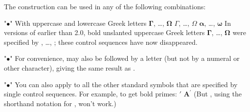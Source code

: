\medskip
The  construction can be used in any of the following
combinations:
\roster
\item"$\bullet$" With uppercase and lowercase Greek letters
\beginexample{\exboxwidth=3.75in}
        $\boldsymbol\Gamma$, \dots, $\boldsymbol\Omega$
        $\boldsymbol\varGamma$, \dots, $\boldsymbol\varOmega$
        $\boldsymbol\alpha$, \dots, $\boldsymbol\omega$
\endexample
\noindent
In versions of \AmSTeX{} earlier than 2.0, bold unslanted uppercase
Greek letters $\boldsymbol\Gamma$, \dots, $\boldsymbol\Omega$ were
specified by , \dots, ; these control
sequences have now disappeared.

\medskip
\item"$\bullet$"
For convenience,  may also be followed by a letter (but
not by a numeral or other character), giving the same result as
.

\medskip
\item"$\bullet$"
You can also apply  to all the other standard symbols that
are specified by single control sequences. For example, to get bold primes:
\beginexample{\exboxwidth=3.75in}
\exbox{}{\$\\boldsymbol\\prime\$} $\boldsymbol\prime$
        $\boldsymbol A^{\boldsymbol\prime}$
\endexample
\noindent
(But , using the shorthand notation for ,
won't work.)

